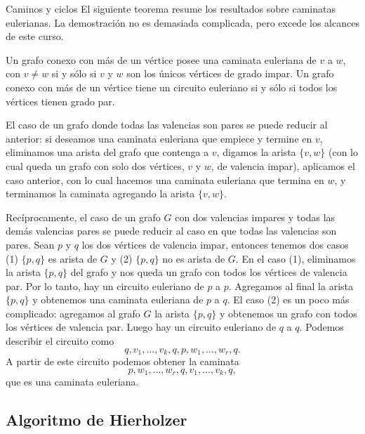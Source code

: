\begin{section}{Caminos y ciclos}
El siguiente teorema resume los resultados sobre caminatas eulerianas. La demostración no es demasiada complicada, pero excede los alcances de este curso.  

\begin{teorema}\label{th-caminata-euleriana} Un grafo conexo con más de un vértice posee una caminata euleriana de $v$ a $w$, con $v \not= w$ si y sólo si $v$ y $w$ son los únicos vértices de grado impar. Un grafo conexo con más de un vértice tiene un circuito euleriano si y sólo si todos los vértices tienen grado par.
\end{teorema}

\begin{observacion}\label{obs-par-a-impar}
    El caso de un grafo donde todas las valencias son pares se puede reducir al anterior: si deseamos una caminata euleriana que empiece y termine en $v$, eliminamos una arista del grafo que contenga a $v$, digamos la arista $\{v,w\}$ (con lo cual queda un grafo  con solo dos vértices, $v$ y $w$, de valencia impar), aplicamos el caso  anterior, con lo cual hacemos una caminata euleriana que termina en  $w$, y terminamos la caminata agregando  la arista $\{v,w\}$. 
\end{observacion}

\begin{observacion}\label{obs-impar-a-par}
    Recíprocamente,  el caso de un grafo  $G$ con dos valencias impares y todas las demás valencias pares  se puede reducir al caso en que todas las valencias son pares. Sean $p$ y $q$ los dos vértices de valencia impar,  entonces tenemos dos casos (1) $\{p,q\}$  es arista de $G$ y (2) $\{p,q\}$  no es arista de $G$.  En el caso (1),  eliminamos la arista  $\{p,q\}$  del grafo  y  nos queda un grafo  con todos los vértices de valencia par. Por lo tanto, hay un circuito euleriano de $p$  a $p$. Agregamos al final la arista $\{p,q\}$  y obtenemos una caminata euleriana de  $p$ a $q$. El caso (2) es un poco más complicado: agregamos al grafo $G$ la arista $\{p,q\}$ y obtenemos un grafo  con todos los vértices de valencia par. Luego  hay un circuito euleriano de $q$ a $q$. Podemos describir el circuito como
    $$
    q,v_1,\ldots,v_k,q,p,w_1,\ldots,w_r,q.
    $$
    A partir de este circuito podemos obtener la caminata
    $$
    p,w_1,\ldots,w_r,q,v_1,\ldots,v_k,q, 
    $$
    que es una caminata euleriana. 
\end{observacion}

\subsection*{Algoritmo de Hierholzer}


\end{section}
